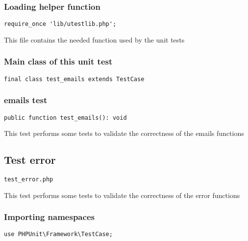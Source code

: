 \documentclass[a4paper]{article}
\begin{document}
\hypertarget{toc141}{}
\subsubsection{Loading helper function}

\begin{lstlisting}
require_once 'lib/utestlib.php';
\end{lstlisting}

This file contains the needed function used by the unit tests

\hypertarget{toc142}{}
\subsubsection{Main class of this unit test}

\begin{lstlisting}
final class test_emails extends TestCase
\end{lstlisting}

\hypertarget{toc143}{}
\subsubsection{emails test}

\begin{lstlisting}
public function test_emails(): void
\end{lstlisting}

This test performs some tests to validate the correctness
of the emails functions

\hypertarget{toc144}{}
\subsection{Test error}

\begin{lstlisting}
test_error.php
\end{lstlisting}

This test performs some tests to validate the correctness
of the error functions

\hypertarget{toc145}{}
\subsubsection{Importing namespaces}

\begin{lstlisting}
use PHPUnit\Framework\TestCase;
\end{lstlisting}

\hypertarget{toc146}{}
\end{document}
